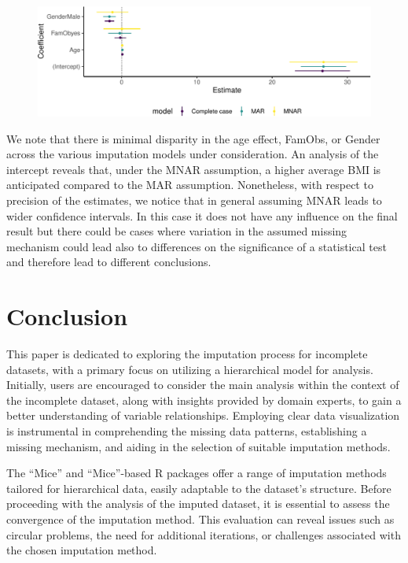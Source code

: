 \documentclass[
  article]{jss}
\begin{document}
\begin{figure}[h]

{\centering \includegraphics{manuscript_files/figure-pdf/models-1.pdf}

}

\end{figure}

We note that there is minimal disparity in the age effect, FamObs, or
Gender across the various imputation models under consideration. An
analysis of the intercept reveals that, under the MNAR assumption, a
higher average BMI is anticipated compared to the MAR assumption.
Nonetheless, with respect to precision of the estimates, we notice that
in general assuming MNAR leads to wider confidence intervals. In this
case it does not have any influence on the final result but there could
be cases where variation in the assumed missing mechanism could lead
also to differences on the significance of a statistical test and
therefore lead to different conclusions.

\hypertarget{conclusion}{%
\section{Conclusion}\label{conclusion}}

This paper is dedicated to exploring the imputation process for
incomplete datasets, with a primary focus on utilizing a hierarchical
model for analysis. Initially, users are encouraged to consider the main
analysis within the context of the incomplete dataset, along with
insights provided by domain experts, to gain a better understanding of
variable relationships. Employing clear data visualization is
instrumental in comprehending the missing data patterns, establishing a
missing mechanism, and aiding in the selection of suitable imputation
methods.

The ``Mice'' and ``Mice''-based R packages offer a range of imputation
methods tailored for hierarchical data, easily adaptable to the
dataset's structure. Before proceeding with the analysis of the imputed
dataset, it is essential to assess the convergence of the imputation
method. This evaluation can reveal issues such as circular problems, the
need for additional iterations, or challenges associated with the chosen
imputation method.
\end{document}
